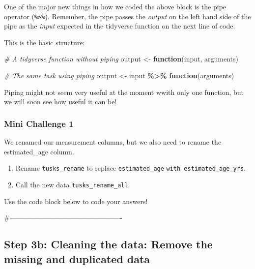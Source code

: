 \documentclass[
]{article}
\newenvironment{Shaded}{\begin{snugshade}}{\end{snugshade}}
\newcommand{\CommentTok}[1]{\textcolor[rgb]{0.56,0.35,0.01}{\textit{#1}}}
\newcommand{\ControlFlowTok}[1]{\textcolor[rgb]{0.13,0.29,0.53}{\textbf{#1}}}
\newcommand{\NormalTok}[1]{#1}
\newcommand{\OtherTok}[1]{\textcolor[rgb]{0.56,0.35,0.01}{#1}}
\newcommand{\SpecialCharTok}[1]{\textcolor[rgb]{0.81,0.36,0.00}{\textbf{#1}}}
\providecommand{\tightlist}{%
  \setlength{\itemsep}{0pt}\setlength{\parskip}{0pt}}
\begin{document}
One of the major new things in how we coded the above block is the pipe
operator (\texttt{\%\textgreater{}\%}). Remember, the pipe passes the
\emph{output} on the left hand side of the pipe as the \emph{input}
expected in the tidyverse function on the next line of code.

This is the basic structure:

\begin{Shaded}
\begin{Highlighting}[]
\CommentTok{\# A tidyverse function without piping}
\NormalTok{output }\OtherTok{\textless{}{-}} \ControlFlowTok{function}\NormalTok{(input, arguments)}
  
\CommentTok{\# The same task using piping}
\NormalTok{output }\OtherTok{\textless{}{-}}\NormalTok{ input }\SpecialCharTok{\%\textgreater{}\%}
  \ControlFlowTok{function}\NormalTok{(arguments)}
\end{Highlighting}
\end{Shaded}

Piping might not seem very useful at the moment wwith only one function,
but we will soon see how useful it can be!

\subsubsection{\texorpdfstring{\textbf{Mini Challenge
1}}{Mini Challenge 1}}\label{mini-challenge-1}

We renamed our measurement columns, but we also need to rename the
estimated\_age column.

\begin{enumerate}
\def\labelenumi{\arabic{enumi}.}
\tightlist
\item
  Rename \texttt{tusks\_rename} to replace \texttt{estimated\_age}
  \texttt{with\ estimated\_age\_yrs}.
\item
  Call the new data \texttt{tusks\_rename\_all}
\end{enumerate}

Use the code block below to code your answers!

\#-------------------------------------------------

\subsection{\texorpdfstring{Step 3b: \textbf{Cleaning the data: Remove
the missing and duplicated
data}}{Step 3b: Cleaning the data: Remove the missing and duplicated data}}\label{step-3b-cleaning-the-data-remove-the-missing-and-duplicated-data}
\end{document}
